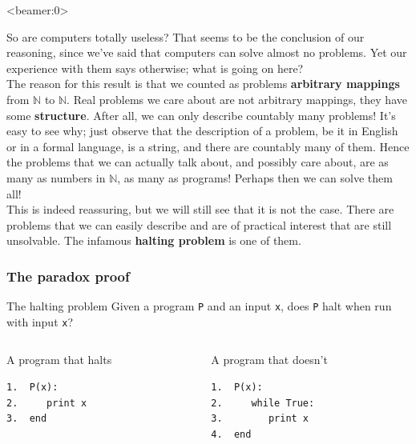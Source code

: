 \documentclass[handout, 12pt]{beamer}
\newcommand{\N}{\mathbb{N}}
\begin{document}
\begin{frame}<beamer:0>

\footnotesize
So are computers totally useless? That seems to be the conclusion of our reasoning, since we've said that computers can solve almost no problems. Yet our experience with them says otherwise; what is going on here?
\\[0.6em]
The reason for this result is that we counted as problems \textbf{arbitrary mappings} from $\N$ to $\N$. Real problems we care about are not arbitrary mappings, they have some \textbf{structure}. After all, we can only describe countably many problems! It's easy to see why; just observe that the description of a problem, be it in English or in a formal language, is a string, and there are countably many of them. Hence the problems that we can actually talk about, and possibly care about, are as many as numbers in $\N$, as many as programs! Perhaps then we can solve them all!
\\[0.6em]
This is indeed reassuring, but we will still see that it is not the case. There are problems that we can easily describe and are of practical interest that are still unsolvable. The infamous \textbf{halting problem} is one of them.

\end{frame}

\begin{frame}[fragile]

\frametitle{The paradox proof}

\begin{block}{The halting problem}
Given a program \texttt{P} and an input \texttt{x}, does \texttt{P} halt when run with input \texttt{x}?
\end{block}

\pause

\begin{block}{}
\begin{columns}[c] 
\begin{column}{0.4\textwidth}
A program that halts
\begin{verbatim}
1.  P(x):
2.     print x
3.  end  
  
\end{verbatim}
\end{column}
\hspace{-2.3em}\vrule\hspace{2.3em}
\begin{column}{0.4\textwidth}
A program that doesn't
\begin{verbatim}
1.  P(x):
2.     while True:
3.        print x
4.  end
\end{verbatim}
\end{column}
\end{columns}
\end{block}

\end{frame}
\end{document}
